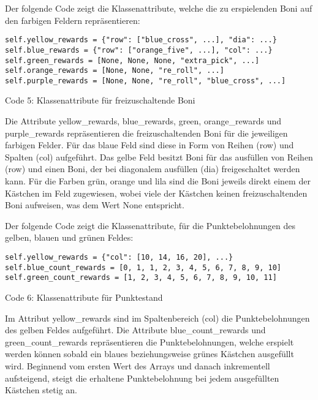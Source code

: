 \begin{minipage}{\linewidth}
Der folgende Code zeigt die Klassenattribute, welche die zu erspielenden Boni auf den farbigen Feldern repräsentieren:
\vspace{0.5cm}
\begin{lstlisting}
self.yellow_rewards = {"row": ["blue_cross", ...], "dia": ...}
self.blue_rewards = {"row": ["orange_five", ...], "col": ...}
self.green_rewards = [None, None, None, "extra_pick", ...]
self.orange_rewards = [None, None, "re_roll", ...]
self.purple_rewards = [None, None, "re_roll", "blue_cross", ...]
\end{lstlisting}
Code 5: Klassenattribute für freizuschaltende Boni\\
\end{minipage}

Die Attribute yellow\_rewards, blue\_rewards, green, orange\_rewards und purple\_rewards repräsentieren die freizuschaltenden Boni für die jeweiligen farbigen Felder. Für das blaue Feld sind diese in Form von Reihen (row) und Spalten (col) aufgeführt. Das gelbe Feld besitzt Boni für das ausfüllen von Reihen (row) und einen Boni, der bei diagonalem ausfüllen (dia) freigeschaltet werden kann. Für die Farben grün, orange und lila sind die Boni jeweils direkt einem der Kästchen im Feld zugewiesen, wobei viele der Kästchen keinen freizuschaltenden Boni aufweisen, was dem Wert None entspricht.\\

\begin{minipage}{\linewidth}
Der folgende Code zeigt die Klassenattribute, für die Punktebelohnungen des gelben, blauen und grünen Feldes:
\vspace{0.5cm}
\begin{lstlisting}
self.yellow_rewards = {"col": [10, 14, 16, 20], ...}
self.blue_count_rewards = [0, 1, 1, 2, 3, 4, 5, 6, 7, 8, 9, 10]
self.green_count_rewards = [1, 2, 3, 4, 5, 6, 7, 8, 9, 10, 11]
\end{lstlisting}
Code 6: Klassenattribute für Punktestand\\
\end{minipage}

Im Attribut yellow\_rewards sind im Spaltenbereich (col) die Punktebelohnungen des gelben Feldes aufgeführt. Die Attribute blue\_count\_rewards und green\_count\_rewards repräsentieren die Punktebelohnungen, welche erspielt werden können sobald ein blaues beziehungsweise grünes Kästchen ausgefüllt wird. Beginnend vom ersten Wert des Arrays und danach inkrementell aufsteigend, steigt die erhaltene Punktebelohnung bei jedem ausgefüllten Kästchen stetig an.\\

